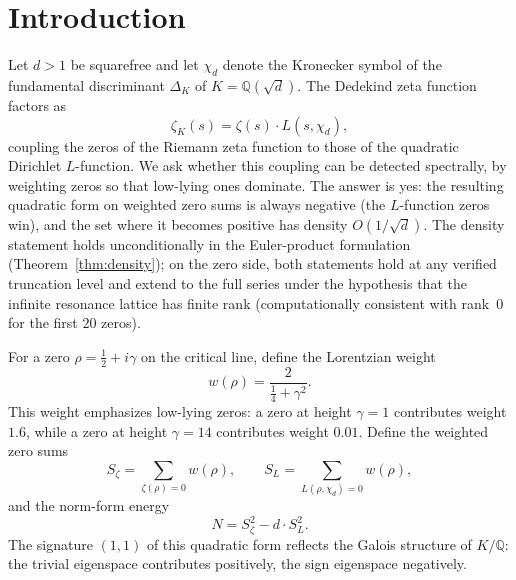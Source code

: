 \documentclass[12pt,reqno]{amsart}
\theoremstyle{plain}
\theoremstyle{definition}
\theoremstyle{remark}
\newcommand{\Q}{\mathbb{Q}}
\newcommand{\half}{\tfrac{1}{2}}
\newcommand{\quarter}{\tfrac{1}{4}}
\begin{document}

\maketitle
\setcounter{tocdepth}{2}
\label{toc}
\tableofcontents

\section{Introduction}\label{sec:intro}

Let $d > 1$ be squarefree and let $\chi_d$ denote the Kronecker symbol of the fundamental discriminant $\Delta_K$ of $K = \Q(\sqrt{d})$. The Dedekind zeta function factors as
\begin{equation}\label{eq:zeta-K-factor}
\zeta_K(s) = \zeta(s) \cdot L(s, \chi_d),
\end{equation}
coupling the zeros of the Riemann zeta function to those of the quadratic Dirichlet $L$-function.  We ask whether this coupling can be detected spectrally, by weighting zeros so that low-lying ones dominate.  The answer is yes: the resulting quadratic form on weighted zero sums is always negative (the $L$-function zeros win), and the set where it becomes positive has density $O(1/\sqrt{d})$.  The density statement holds unconditionally in the Euler-product formulation (Theorem~\ref{thm:density}); on the zero side, both statements hold at any verified truncation level and extend to the full series under the hypothesis that the infinite resonance lattice has finite rank (computationally consistent with rank~$0$ for the first $20$ zeros).

For a zero $\rho = \half + i\gamma$ on the critical line, define the Lorentzian weight
\begin{equation}\label{eq:lorentzian-weight}
w(\rho) = \frac{2}{\quarter + \gamma^2}.
\end{equation}
This weight emphasizes low-lying zeros: a zero at height $\gamma = 1$ contributes weight $1.6$, while a zero at height $\gamma = 14$ contributes weight $0.01$. Define the weighted zero sums
\begin{equation}\label{eq:S-sums-intro}
S_\zeta = \sum_{\zeta(\rho) = 0} w(\rho), \qquad S_L = \sum_{L(\rho, \chi_d) = 0} w(\rho),
\end{equation}
and the norm-form energy
\begin{equation}\label{eq:norm-form-intro}
N = S_\zeta^2 - d \cdot S_L^2.
\end{equation}
The signature $(1,1)$ of this quadratic form reflects the Galois structure of $K/\Q$: the trivial eigenspace contributes positively, the sign eigenspace negatively.
\end{document}

